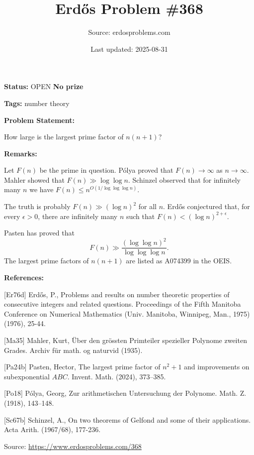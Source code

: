 \documentclass{article}
\title{Erd\H{o}s Problem \#368}
\date{Last updated: 2025-08-31}
\author{Source: erdosproblems.com}
\begin{document}
\maketitle

\noindent\textbf{Status:} OPEN \quad \textbf{No prize}

\noindent\textbf{Tags:} number theory

\medskip
\noindent\textbf{Problem Statement:}

How large is the largest prime factor of $n(n+1)$?

\bigskip
\noindent\textbf{Remarks:}

Let $F(n)$ be the prime in question. P\'{o}lya \cite{Po18} proved that $F(n)\to \infty$ as $n\to\infty$. Mahler \cite{Ma35} showed that $F(n)\gg \log\log n$. Schinzel \cite{Sc67b} observed that for infinitely many $n$ we have $F(n)\leq n^{O(1/\log\log\log n)}$. 

The truth is probably $F(n)\gg (\log n)^2$ for all $n$. Erd\H{o}s \cite{Er76d} conjectured that, for every $\epsilon>0$, there are infinitely many $n$ such that $F(n) <(\log n)^{2+\epsilon}$.

Pasten \cite{Pa24b} has proved that\[F(n) \gg \frac{(\log\log n)^2}{\log\log\log n}.\]The largest prime factors of $n(n+1)$ are listed as A074399 in the OEIS.

\bigskip
\noindent\textbf{References:}

[Er76d] Erd\H{o}s, P., Problems and results on number theoretic properties of consecutive integers and related questions. Proceedings of the Fifth Manitoba Conference on Numerical Mathematics (Univ. Manitoba, Winnipeg, Man., 1975) (1976), 25-44.
 
 [Ma35] Mahler, Kurt, \"{U}ber den gr\"{o}ssten Primteiler spezieller Polynome zweiten Grades. Archiv f\"{u}r math. og naturvid (1935).
 
 [Pa24b] Pasten, Hector, The largest prime factor of {$n^2+1$} and improvements on
subexponential {$ABC$}. Invent. Math. (2024), 373--385.
 
 [Po18] P\'{o}lya, Georg, Zur arithmetischen {U}ntersuchung der {P}olynome. Math. Z. (1918), 143--148.
 
 [Sc67b] Schinzel, A., On two theorems of Gelfond and some of their applications. Acta Arith. (1967/68), 177-236.

\bigskip
\noindent\small{Source: \url{https://www.erdosproblems.com/368}}
\end{document}
